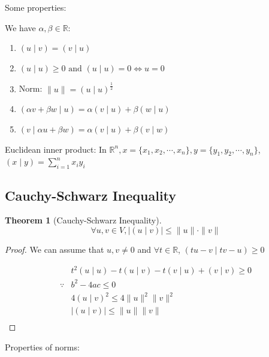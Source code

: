 \documentclass{article}
\newtheorem*{theorem}{Theorem}
\newcommand{\abs}[1]{\left| #1 \right|}
\newcommand{\inpro}[2]{(#1 \mid #2)}
\newcommand{\norm}[1]{\| #1 \|}
\begin{document}
    Some properties:
    
    We have $\alpha, \beta \in \mathbb{R}$:
    
    \begin{enumerate}
        \item $(u \mid v) = (v \mid u)$
        \item $(u \mid u) \geq 0 \text{ and } (u \mid u) = 0 \iff u = 0$
        \item Norm: $\norm{u} = (u \mid u)^{\frac{1}{2}}$
        \item $(\alpha v + \beta w \mid u) = \alpha (v \mid u) + \beta (w \mid u)$
        \item $(v \mid \alpha u + \beta w) = \alpha (v \mid u) + \beta (v \mid w)$
    \end{enumerate}
    
    Euclidean inner product: In $\mathbb{R}^{n}, x = \{ x_{1}, x_{2}, \cdots, x_{n} \}, y = \{ y_{1}, y_{2}, \cdots, y_{n} \}$, $(x \mid y) = \sum_{i = 1}^{n} x_{i}y_{i}$
    
    \subsection{Cauchy-Schwarz Inequality}
    
    \begin{theorem}[Cauchy-Schwarz Inequality]
        \begin{displaymath}
            \forall u, v \in V, \abs{\inpro{u}{v}} \leq \norm{u} \cdot \norm{v}
        \end{displaymath}
    \end{theorem}
    
    \begin{proof}
        We can assume that $u, v \neq 0$ and $\forall t \in \mathbb{R}$, $\inpro{tu - v}{tv - u} \geq 0$
        
        \begin{align*}
            &t^{2}\inpro{u}{u} - t\inpro{u}{v} - t\inpro{v}{u} + \inpro{v}{v} \geq 0 \\
            \because &b^{2} - 4ac \leq 0 \\
            &4\inpro{u}{v}^{2} \leq 4\norm{u}^{2}\norm{v}^{2} \\
            &\abs{\inpro{u}{v}} \leq \norm{u}\norm{v} \\
        \end{align*}
    \end{proof}

    Properties of norms:
    
\end{document}
